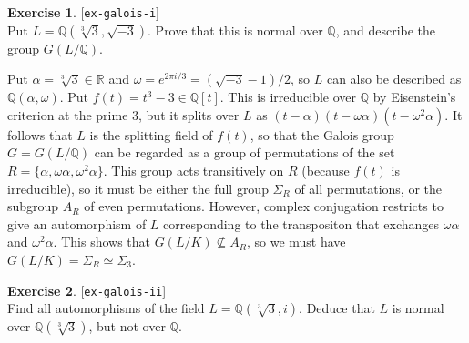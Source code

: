 \documentclass{amsart}
\newcommand{\Q}         {{\mathbb{Q}}}
\newcommand{\R}         {{\mathbb{R}}}
\newcommand{\al}        {\alpha}
\newcommand{\om}        {\omega}
\newcommand{\Sg}        {\Sigma}
\newcommand{\sse}       {\subseteq}
\renewcommand{\:}{\colon}
\newcommand{\lastexlabel}{}
\newcommand{\exlabel}[1]{
 \global\def\lastexlabel{#1}\label{#1}[\texttt{#1}]\ \\
}
\newcommand{\exlabel}[1]{
 \global\def\lastexlabel{#1}\label{#1}
}
\newenvironment{solution}{\SolutionInline}{\endSolutionInline}
\theoremstyle{definition}
\newtheorem{exercise}{Exercise}[section]
\renewenvironment{solution}{\SolutionAtEnd}{\endSolutionAtEnd}
\begin{document}
\begin{exercise}\exlabel{ex-galois-i}
 Put $L=\Q(\sqrt[3]{3},\sqrt{-3})$.  Prove that this is normal over
 $\Q$, and describe the group $G(L/\Q)$.
\end{exercise}
\begin{solution}
 Put $\al=\sqrt[3]{3}\in\R$ and $\om=e^{2\pi i/3}=(\sqrt{-3}-1)/2$, so
 $L$ can also be described as $\Q(\al,\om)$.  Put
 $f(t)=t^3-3\in\Q[t]$.  This is irreducible over $\Q$ by Eisenstein's
 criterion at the prime $3$, but it splits over $L$ as
 $(t-\al)(t-\om\al)(t-\om^2\al)$.  It follows that $L$ is the
 splitting field of $f(t)$, so that the Galois group $G=G(L/\Q)$ can
 be regarded as a group of permutations of the set
 $R=\{\al,\om\al,\om^2\al\}$.  This group acts transitively on $R$
 (because $f(t)$ is irreducible), so it must be either the full group
 $\Sg_R$ of all permutations, or the subgroup $A_R$ of even
 permutations.  However, complex conjugation restricts to give an
 automorphism of $L$ corresponding to the transpositon that exchanges
 $\om\al$ and $\om^2\al$.  This shows that $G(L/K)\not\sse A_R$, so we
 must have $G(L/K)=\Sg_R\simeq\Sg_3$.
\end{solution}
\begin{exercise}\exlabel{ex-galois-ii}
 Find all automorphisms of the field $L=\Q(\sqrt[3]{3},i)$.  Deduce
 that $L$ is normal over $\Q(\sqrt[3]{3})$, but not over $\Q$.
\end{exercise}
\end{document}
